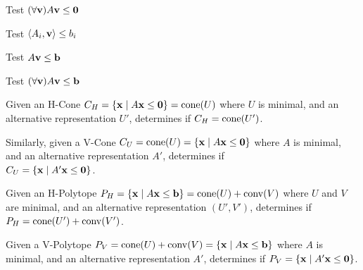 Test $(\forall \mathbf{v}) A\mathbf{v} \leq \mathbf{0}$
\lstrayssatisfied

Test $\left\langle A_i, \mathbf{v} \right\rangle \leq b_i$
\lstvecsatisfieda

Test $A\mathbf{v} \leq \mathbf{b}$
\lstvecsatisfiedb

Test $(\forall \mathbf{v}) A\mathbf{v} \leq \mathbf{b}$
\lstvecssatisfied

Given an H-Cone $C_H = \left\{\mathbf{x}\;|\; A\mathbf{x}\leq\mathbf{0}\right\} = \operatorname{cone}(U)$ where $U$ is minimal, and an alternative representation $U'$, determines if $C_H = \operatorname{cone}(U')$.

Similarly, given a V-Cone $C_U = \operatorname{cone}(U) = \left\{\mathbf{x}\;|\; A\mathbf{x}\leq\mathbf{0}\right\}$ where $A$ is minimal, and an alternative representation $A'$, determines if \\
$C_U = \left\{\mathbf{x}\;|\; A'\mathbf{x}\leq\mathbf{0}\right\}$.
\lstequivalentconerep

Given an H-Polytope $P_H = \left\{\mathbf{x}\;|\; A\mathbf{x}\leq\mathbf{b}\right\} = \operatorname{cone}(U) + \operatorname{conv}(V)$ where $U$ and $V$ are minimal, and an alternative representation $(U',V')$, determines if $P_H = \operatorname{cone}(U') + \operatorname{conv}(V')$.
\lstequivalenthpolyrep

Given a V-Polytope $P_V = \operatorname{cone}(U) + \operatorname{conv}(V) = \left\{\mathbf{x}\;|\; A\mathbf{x}\leq\mathbf{b}\right\}$ where $A$ is minimal, and an alternative representation $A'$, determines if $P_V = \left\{\mathbf{x}\;|\; A'\mathbf{x}\leq\mathbf{0}\right\}$.
\lstequivalentvpolyrep



